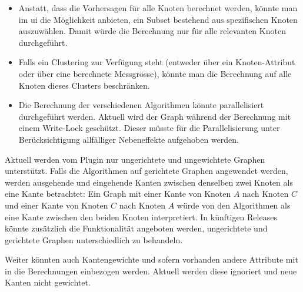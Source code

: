 \begin{itemize}
    \item Anstatt, dass die Vorhersagen für alle Knoten berechnet werden, könnte man im \acs{ui} die Möglichkeit anbieten, ein Subset bestehend aus spezifischen Knoten auszuwählen. Damit würde die Berechnung nur für alle relevanten Knoten durchgeführt.
    \item Falls ein Clustering zur Verfügung steht (entweder über ein Knoten-Attribut oder über eine berechnete Messgrösse), könnte man die Berechnung auf alle Knoten dieses Clusters beschränken.
    \item Die Berechnung der verschiedenen Algorithmen könnte parallelisiert durchgeführt werden. Aktuell wird der Graph während der Berechnung mit einem Write-Lock geschützt. Dieser müsste für die Parallelisierung unter Berücksichtigung allfälliger Nebeneffekte aufgehoben werden.
\end{itemize}

Aktuell werden vom Plugin nur ungerichtete und ungewichtete Graphen unterstützt.
Falls die Algorithmen auf gerichtete Graphen angewendet werden, werden ausgehende und eingehende Kanten zwischen denselben zwei Knoten als eine Kante betrachtet:
Ein Graph mit einer Kante von Knoten $A$ nach Knoten $C$ und einer Kante von Knoten $C$ nach Knoten $A$ würde von den Algorithmen als eine Kante zwischen den beiden Knoten interpretiert.
In künftigen Releases könnte zusätzlich die Funktionalität angeboten werden, ungerichtete und gerichtete Graphen unterschiedlich zu behandeln.

Weiter könnten auch Kantengewichte und sofern vorhanden andere Attribute mit in die Berechnungen einbezogen werden.
Aktuell werden diese ignoriert und neue Kanten nicht gewichtet.

